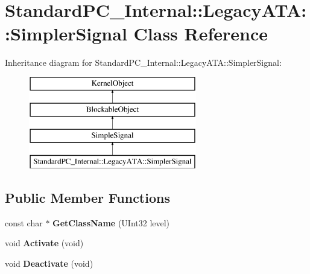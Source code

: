 \hypertarget{class_standard_p_c___internal_1_1_legacy_a_t_a_1_1_simpler_signal}{}\section{Standard\+P\+C\+\_\+\+Internal\+:\+:Legacy\+A\+TA\+:\+:Simpler\+Signal Class Reference}
\label{class_standard_p_c___internal_1_1_legacy_a_t_a_1_1_simpler_signal}
Inheritance diagram for Standard\+P\+C\+\_\+\+Internal\+:\+:Legacy\+A\+TA\+:\+:Simpler\+Signal\+:\begin{figure}[H]
\begin{center}
\leavevmode
\includegraphics[height=4.000000cm]{class_standard_p_c___internal_1_1_legacy_a_t_a_1_1_simpler_signal}
\end{center}
\end{figure}
\subsection*{Public Member Functions}
\begin{DoxyCompactItemize}
\item 
\mbox{\label{class_standard_p_c___internal_1_1_legacy_a_t_a_1_1_simpler_signal_a66236ca8396f756ca0556a4f0a200ad2}} 
const char $\ast$ {\bfseries Get\+Class\+Name} (U\+Int32 level)
\item 
\mbox{\label{class_standard_p_c___internal_1_1_legacy_a_t_a_1_1_simpler_signal_aa8daf5227c74548b1f9865b19cd07c1d}} 
void {\bfseries Activate} (void)
\item 
\mbox{\label{class_standard_p_c___internal_1_1_legacy_a_t_a_1_1_simpler_signal_a0559683923c3b82584b7afc0919e0485}} 
void {\bfseries Deactivate} (void)
\end{DoxyCompactItemize}
